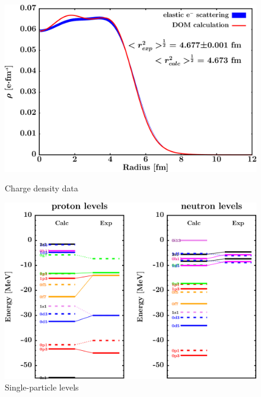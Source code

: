 \begin{figure}[H]
    \centering
    \begin{minipage}{0.45\textwidth}
        \centering
        \includegraphics[width=1.0\textwidth]{figures/sn124_chargeDensity.png}
        \caption{Charge density data}
        \label{DOMFitData_sn124_chargeDensity}
    \end{minipage}\hfill
    \begin{minipage}{0.45\textwidth}
        \centering
        \includegraphics[width=1.0\textwidth]{figures/sn124_SPLevels.png}
        \caption{Single-particle levels}
        \label{DOMFitData_sn124_SPLevels}
    \end{minipage}
\end{figure}

\afterpage{\clearpage}

